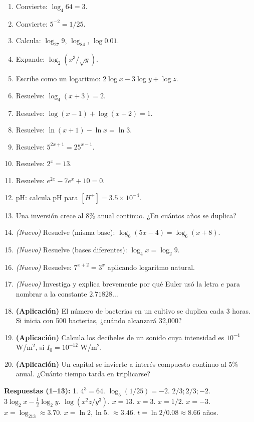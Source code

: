 \documentclass[12pt,letterpaper]{book}
\begin{document}
\begin{enumerate}
\item Convierte: $\log_4 64=3$.
\item Convierte: $5^{-2}=1/25$.
\item Calcula: $\log_{27}9$, $\log_84$, $\log0.01$.
\item Expande: $\log_2(x^3/\sqrt y)$.
\item Escribe como un logaritmo: $2\log x-3\log y+\log z$.
\item Resuelve: $\log_4(x+3)=2$.
\item Resuelve: $\log(x-1)+\log(x+2)=1$.
\item Resuelve: $\ln(x+1)-\ln x=\ln3$.
\item Resuelve: $5^{2x+1}=25^{x-1}$.
\item Resuelve: $2^x=13$.
\item Resuelve: $e^{2x}-7e^x+10=0$.
\item pH: calcula pH para $[H^+]=3.5\times10^{-4}$.
\item Una inversión crece al 8\% anual continuo. ¿En cuántos años se duplica?
\item \textit{(Nuevo)} Resuelve (misma base): $\log_6(5x-4)=\log_6(x+8)$.
\item \textit{(Nuevo)} Resuelve (bases diferentes): $\log_4 x=\log_2 9$.
\item \textit{(Nuevo)} Resuelve: $7^{x+2}=3^{x}$ aplicando logaritmo natural.
\item \textit{(Nuevo)} Investiga y explica brevemente por qué Euler usó la letra $e$ para nombrar a la constante $2.71828\ldots$
\item \textbf{(Aplicación)} El número de bacterias en un cultivo se duplica cada 3 horas. Si inicia con 500 bacterias, ¿cuándo alcanzará 32{,}000?
\item \textbf{(Aplicación)} Calcula los decibeles de un sonido cuya intensidad es $10^{-4}$ W/m$^2$, si $I_0=10^{-12}$ W/m$^2$.
\item \textbf{(Aplicación)} Un capital se invierte a interés compuesto continuo al 5\% anual. ¿Cuánto tiempo tarda en triplicarse?
\end{enumerate}

\textbf{Respuestas (1--13):} 1. $4^3=64$. $\log_5(1/25)=-2$. $2/3;2/3;-2$. $3\log_2x-\tfrac12\log_2y$. $\log(x^2z/y^3)$. $x=13$. $x=3$. $x=1/2$. $x=-3$. $x=\log_213\approx3.70$. $x=\ln2,\ln5$. $\approx3.46$. $t=\ln2/0.08\approx8.66$ años.
\end{document}

